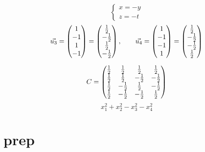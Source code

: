 \begin{itemize}
    $$
    \begin{cases}
    	x = -y \\
        z = -t
    \end{cases} $$
    $$ \vec{u_3} =
    \begin{pmatrix}
    	1 \\
        -1 \\
        1 \\
        -1
    \end{pmatrix} =
    \begin{pmatrix}
    	\frac{1}2 \\
        -\frac{1}2 \\
        \frac{1}2 \\
        -\frac{1}2
    \end{pmatrix}, \qquad \vec{u_4} =
    \begin{pmatrix}
    	1 \\
        -1 \\
        -1 \\
        1
    \end{pmatrix} =
    \begin{pmatrix}
    	\frac{1}2 \\
        -\frac{1}2 \\
        -\frac{1}2 \\
        \frac{1}2
    \end{pmatrix} $$
\end{itemize}
$$ C =
\begin{pmatrix}
	\frac{1}2 & \frac{1}2 & \frac{1}2 & \frac{1}2 \\
    \frac{1}2 & \frac{1}2 & -\frac{1}2 & -\frac{1}2 \\
    \frac{1}2 & -\frac{1}2 & \frac{1}2 & -\frac{1}2 \\
    \frac{1}2 & -\frac{1}2 & -\frac{1}2 & \frac{1}2
\end{pmatrix} $$
$$ x_1^2 + x_2^2 - x_3^2 - x_4^2 $$

\section{prep}

